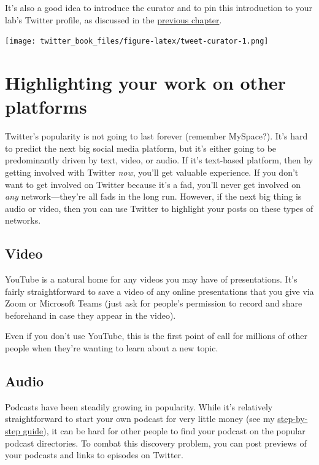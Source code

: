 \documentclass[
]{book}
\begin{document}
It's also a good idea to introduce the curator and to pin this introduction to your lab's Twitter profile, as discussed in the \protect\hyperlink{intermediate}{previous chapter}.

\texttt{[image: twitter\_book\_files/figure-latex/tweet-curator-1.png]}

\hypertarget{highlighting-your-work-on-other-platforms}{%
\section*{Highlighting your work on other platforms}\label{highlighting-your-work-on-other-platforms}}

Twitter's popularity is not going to last forever (remember MySpace?). It's hard to predict the next big social media platform, but it's either going to be predominantly driven by text, video, or audio. If it's text-based platform, then by getting involved with Twitter \emph{now}, you'll get valuable experience. If you don't want to get involved on Twitter because it's a fad, you'll never get involved on \emph{any} network---they're all fads in the long run. However, if the next big thing is audio or video, then you can use Twitter to highlight your posts on these types of networks.

\hypertarget{video}{%
\subsection{Video}\label{video}}

YouTube is a natural home for any videos you may have of presentations. It's fairly straightforward to save a video of any online presentations that you give via Zoom or Microsoft Teams (just ask for people's permission to record and share beforehand in case they appear in the video).

Even if you don't use YouTube, this is the first point of call for millions of other people when they're wanting to learn about a new topic.

\hypertarget{audio}{%
\subsection{Audio}\label{audio}}

Podcasts have been steadily growing in popularity. While it's relatively straightforward to start your own podcast for very little money (see my \href{https://www.dsquintana.blog/podcast-guide/}{step-by-step guide}), it can be hard for other people to find your podcast on the popular podcast directories. To combat this discovery problem, you can post previews of your podcasts and links to episodes on Twitter.
\end{document}

